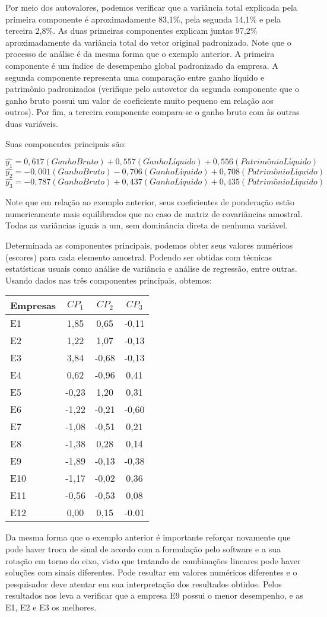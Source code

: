 \documentclass[
  openany]{book}
\begin{document}
Por meio dos autovalores, podemos verificar que a variância total explicada pela primeira componente é aproximadamente 83,1\%, pela segunda 14,1\% e pela terceira 2,8\%. As duas primeiras componentes explicam juntas 97,2\% aproximadamente da variância total do vetor original padronizado. Note que o processo de análise é da mesma forma que o exemplo anterior. A primeira componente é um índice de desempenho global padronizado da empresa. A segunda componente representa uma comparação entre ganho líquido e patrimônio padronizados (verifique pelo autovetor da segunda componente que o ganho bruto possui um valor de coeficiente muito pequeno em relação aos outros). Por fim, a terceira componente compara-se o ganho bruto com às outras duas variáveis.

Suas componentes principais são:

\[\hat{y_1}=0,617(Ganho Bruto)+0,557(GanhoLíquido)+0,556(PatrimônioLíquido)\]
\[\hat{y_2}=-0,001(Ganho Bruto)-0,706(GanhoLíquido)+0,708(PatrimônioLíquido)\]
\[\hat{y_3}=-0,787(Ganho Bruto)+0,437(GanhoLíquido)+0,435(PatrimônioLíquido)\]

Note que em relação ao exemplo anterior, seus coeficientes de ponderação estão numericamente mais equilibrados que no caso de matriz de covariâncias amostral. Todas as variâncias iguais a um, sem dominância direta de nenhuma variável.

Determinada as componentes principais, podemos obter seus valores numéricos (escores) para cada elemento amostral. Podendo ser obtidas com técnicas estatísticas usuais como análise de variância e análise de regressão, entre outras. Usando dados nas três componentes principais, obtemos:

\begin{longtable}[]{@{}lccc@{}}
\toprule
\textbf{Empresas} & \textbf{\(CP_1\)} & \textbf{\(CP_2\)} & \textbf{\(CP_3\)}\tabularnewline
\midrule
\endhead
E1 & 1,85 & 0,65 & -0,11\tabularnewline
E2 & 1,22 & 1,07 & -0,13\tabularnewline
E3 & 3,84 & -0,68 & -0,13\tabularnewline
E4 & 0,62 & -0,96 & 0,41\tabularnewline
E5 & -0,23 & 1,20 & 0,31\tabularnewline
E6 & -1,22 & -0,21 & -0,60\tabularnewline
E7 & -1,08 & -0,51 & 0,21\tabularnewline
E8 & -1,38 & 0,28 & 0,14\tabularnewline
E9 & -1,89 & -0,13 & -0,38\tabularnewline
E10 & -1,17 & -0,02 & 0,36\tabularnewline
E11 & -0,56 & -0,53 & 0,08\tabularnewline
E12 & 0,00 & 0,15 & -0.01\tabularnewline
\bottomrule
\end{longtable}

Da mesma forma que o exemplo anterior é importante reforçar novamente que pode haver troca de sinal de acordo com a formulação pelo software e a sua rotação em torno do eixo, visto que tratando de combinações lineares pode haver soluções com sinais diferentes. Pode resultar em valores numéricos diferentes e o pesquisador deve atentar em sua interpretação dos resultados obtidos. Pelos resultados nos leva a verificar que a empresa E9 possui o menor desempenho, e as E1, E2 e E3 os melhores.
\end{document}
